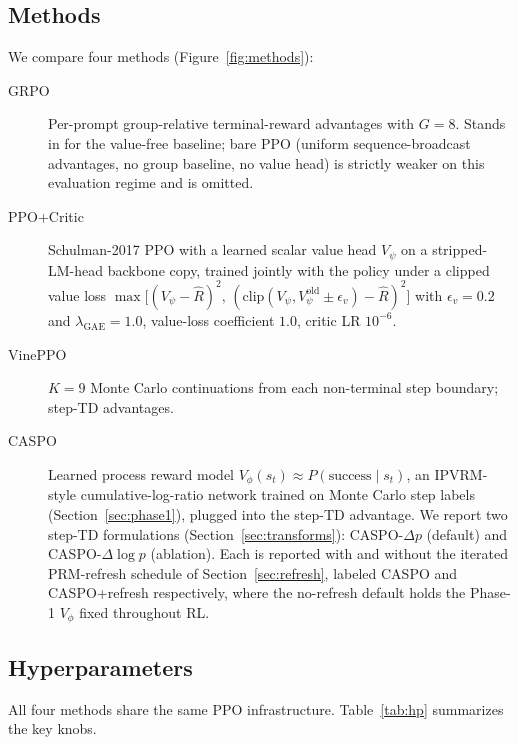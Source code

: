 \documentclass[11pt]{article}
\newcommand{\caspo}{\textsc{CASPO}}
\newcommand{\ppo}{PPO}
\newcommand{\ppocritic}{PPO+Critic}
\newcommand{\grpo}{GRPO}
\newcommand{\ipvrm}{IPVRM}
\newcommand{\vineppo}{VinePPO}
\begin{document}
\subsection{Methods}
We compare four methods (Figure~\ref{fig:methods}):
\begin{description}
\item[\grpo{}] Per-prompt group-relative terminal-reward advantages with
$G=8$. Stands in for the value-free baseline; bare \ppo{} (uniform
sequence-broadcast advantages, no group baseline, no value head) is
strictly weaker on this evaluation regime and is omitted.
\item[\ppocritic{}] Schulman-2017 \ppo{} with a learned scalar value head
$V_\psi$ on a stripped-LM-head backbone copy, trained jointly with the
policy under a clipped value loss
$\max\!\big[(V_\psi - \hat R)^2,\, (\mathrm{clip}(V_\psi, V_\psi^{\mathrm{old}} \pm \epsilon_v) - \hat R)^2\big]$
with $\epsilon_v = 0.2$ and $\lambda_{\mathrm{GAE}} = 1.0$, value-loss
coefficient $1.0$, critic LR $10^{-6}$.
\item[\vineppo{}] $K=9$ Monte Carlo continuations from each non-terminal step
boundary; step-TD advantages.
\item[\caspo{}] Learned process reward model
$V_\phi(s_t) \approx P(\text{success} \mid s_t)$, an \ipvrm{}-style
cumulative-log-ratio network trained on Monte Carlo step labels
(Section~\ref{sec:phase1}), plugged into the step-TD advantage. We report two step-TD formulations
(Section~\ref{sec:transforms}): \caspo{}-$\Delta p$ (default) and
\caspo{}-$\Delta\log p$ (ablation). Each is reported with and without
the iterated PRM-refresh schedule of Section~\ref{sec:refresh},
labeled \caspo{} and \caspo{}+refresh respectively, where the
no-refresh default holds the Phase-1 $V_\phi$ fixed throughout RL.
\end{description}

\subsection{Hyperparameters}
All four methods share the same PPO infrastructure. Table~\ref{tab:hp}
summarizes the key knobs.
\end{document}
